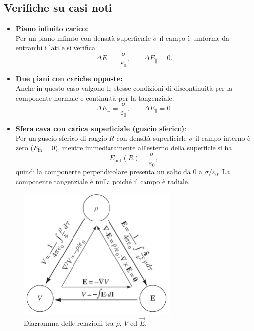 \documentclass{book}
\begin{document}
\subsection*{Verifiche su casi noti}
\begin{itemize}
  \item \textbf{Piano infinito carico:}\\
  Per un piano infinito con densità superficiale $\sigma$ il campo è uniforme da entrambi i lati e si verifica
  $$
  \Delta E_{\perp} = \frac{\sigma}{\varepsilon_0}, \qquad \Delta E_{\parallel} = 0.
  $$
  \item \textbf{Due piani con cariche opposte:}\\
  Anche in questo caso valgono le stesse condizioni di discontinuità per la componente normale e continuità per la tangenziale:
  $$
  \Delta E_{\perp} = \frac{\sigma}{\varepsilon_0}, \qquad \Delta E_{\parallel} = 0.
  $$
  \item \textbf{Sfera cava con carica superficiale (guscio sferico)}:\\
  Per un guscio sferico di raggio $R$ con densità superficiale $\sigma$ il campo interno è zero ($E_{\text{in}}=0$), mentre immediatamente all'esterno della superficie si ha
  $$
  E_{\text{out}}(R)=\frac{\sigma}{\varepsilon_0},
  $$
  quindi la componente perpendicolare presenta un salto da $0$ a $\sigma/\varepsilon_0$. La componente tangenziale è nulla poiché il campo è radiale.
\end{itemize}

\begin{figure}[h]    \centering
\includegraphics[width=0.7\textwidth]{Immagini/Relazioni.png} 
    \caption{Diagramma delle relazioni tra $\rho$, $V$ ed $\vec{E}$.}
    \label{fig:relazioni} 
\end{figure}
\end{document}
